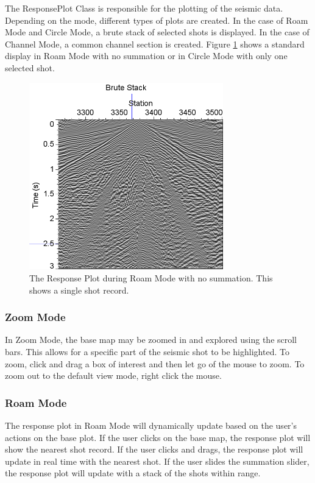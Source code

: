 \documentclass[12pt]{article}
\begin{document}
The ResponsePlot Class is responsible for the plotting of the seismic data. Depending on the mode, different types of plots are created.  In the case of Roam Mode and Circle Mode, a brute stack of selected shots is displayed. In the case of Channel Mode, a common channel section is created. Figure \ref{FIG:RP} shows a standard display in Roam Mode with no summation or in Circle Mode with only one selected shot.

\begin{figure}[H]
\centering
\includegraphics[width=0.75\textwidth]{./figs/fig4.png}
\caption{The Response Plot during Roam Mode with no summation. This shows a single shot record.}
\label{FIG:RP}
\end{figure}

\subsubsection{Zoom Mode}

In Zoom Mode, the base map may be zoomed in and explored using the scroll bars. This allows for a specific part of the seismic shot to be highlighted. To zoom, click and drag a box of interest and then let go of the mouse to zoom. To zoom out to the default view mode, right click the mouse. 

\subsubsection{Roam Mode}

The response plot in Roam Mode will dynamically update based on the user's actions on the base plot. If the user clicks on the base map, the response plot will show the nearest shot record. If the user clicks and drags, the response plot will update in real time with the nearest shot. If the user slides the summation slider, the response plot will update with a stack of the shots within range.
\end{document}
